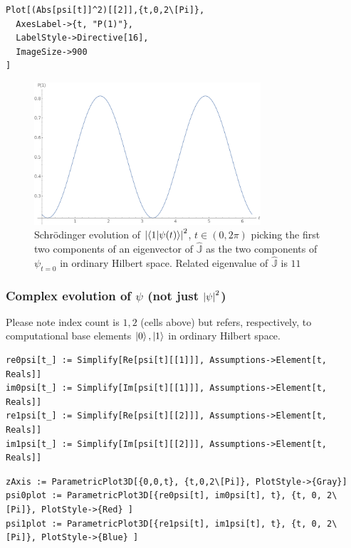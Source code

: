 \begin{Verbatim}
Plot[(Abs[psi[t]]^2)[[2]],{t,0,2\[Pi]},
  AxesLabel->{t, "P(1)"},
  LabelStyle->Directive[16],
  ImageSize->900
]
\end{Verbatim}
\begin{figure}[!h]
  \centering
  \includegraphics[width=0.75\textwidth]{img/probB_1.png}
  \caption[(from notebook)]{
    Schr{\"o}dinger evolution of
    $\qty|\braket{1}{\psi(t)}|^2$, $t \in (0, 2\pi) $
    picking the first two components of an eigenvector of $\hat{\mathbb{J}}$
    as the two components of $\psi_{t=0}$ in ordinary Hilbert space.
    Related eigenvalue of $\hat{\mathbb{J}}$ is $11$
  }
\end{figure}

\subsubsection{Complex evolution of $\psi$ (not just $\qty|\psi|^2$)}

Please note index count is
$1, 2$ (cells above)
but refers, respectively, to computational base elements
$\ket{0}, \ket{1}$ in ordinary Hilbert space.
\begin{Verbatim}
re0psi[t_] := Simplify[Re[psi[t][[1]]], Assumptions->Element[t, Reals]]
im0psi[t_] := Simplify[Im[psi[t][[1]]], Assumptions->Element[t, Reals]]
re1psi[t_] := Simplify[Re[psi[t][[2]]], Assumptions->Element[t, Reals]]
im1psi[t_] := Simplify[Im[psi[t][[2]]], Assumptions->Element[t, Reals]]
\end{Verbatim}

\begin{Verbatim}
zAxis := ParametricPlot3D[{0,0,t}, {t,0,2\[Pi]}, PlotStyle->{Gray}]
psi0plot := ParametricPlot3D[{re0psi[t], im0psi[t], t}, {t, 0, 2\[Pi]}, PlotStyle->{Red} ]
psi1plot := ParametricPlot3D[{re1psi[t], im1psi[t], t}, {t, 0, 2\[Pi]}, PlotStyle->{Blue} ]
\end{Verbatim}


